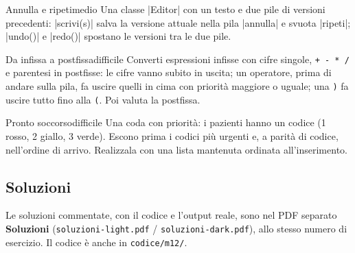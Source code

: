 \begin{esercizio}{Annulla e ripeti}{medio}
Una classe \cc|Editor| con un testo e due pile di versioni precedenti: \cc|scrivi(s)|
salva la versione attuale nella pila \cc|annulla| e svuota \cc|ripeti|; \cc|undo()| e
\cc|redo()| spostano le versioni tra le due pile.
\end{esercizio}

\begin{esercizio}{Da infissa a postfissa}{difficile}
Converti espressioni infisse con cifre singole, \texttt{+ - * /} e parentesi in
postfisse: le cifre vanno subito in uscita; un operatore, prima di andare sulla pila,
fa uscire quelli in cima con priorità maggiore o uguale; una \texttt{)} fa uscire tutto
fino alla \texttt{(}. Poi valuta la postfissa.
\end{esercizio}

\begin{esercizio}{Pronto soccorso}{difficile}
Una coda con priorità: i pazienti hanno un codice (1 rosso, 2 giallo, 3 verde). Escono
prima i codici più urgenti e, a parità di codice, nell'ordine di arrivo. Realizzala con
una lista mantenuta ordinata all'inserimento.
\end{esercizio}

\subsection*{Soluzioni}
Le soluzioni commentate, con il codice e l'output reale, sono nel PDF separato
\textbf{Soluzioni} (\texttt{soluzioni-light.pdf} / \texttt{soluzioni-dark.pdf}),
allo stesso numero di esercizio. Il codice è anche in \texttt{codice/m12/}.
